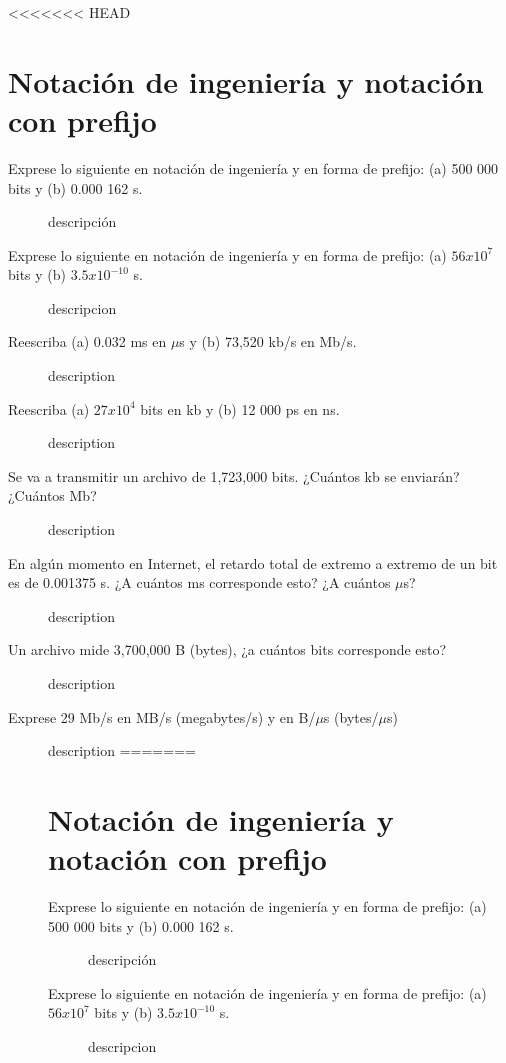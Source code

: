 <<<<<<< HEAD

\section*{Notaci\'on de ingenier\'ia y notaci\'on con prefijo}

\begin{description}
	\item[Exprese lo siguiente en notación de ingeniería y en forma de prefijo: (a) 500 000 bits y (b) 0.000 162 s.] 
	descripción
	
	\item[Exprese lo siguiente en notación de ingeniería y en forma de prefijo: (a) $56x10^7$ bits y (b) $3.5x10^{-10}$ s.]
	descripcion
	
	\item[Reescriba (a) 0.032 ms en $\mu$s y (b) 73,520 kb/s en Mb/s.]
	description
	
	\item[Reescriba (a) $27x10^4$ bits en kb y (b) 12 000 ps en ns.]
	description
	
	\item[Se va a transmitir un archivo de 1,723,000 bits. ¿Cuántos kb se enviarán? ¿Cuántos Mb?] description
	
	\item[En algún momento en Internet, el retardo total de extremo a extremo de un bit es de 0.001375 s. ¿A cuántos ms corresponde esto? ¿A cuántos $\mu$s?]
	description
	
	\item[Un archivo mide 3,700,000 B (bytes), ¿a cuántos bits corresponde esto?]
	description
	
	\item[Exprese 29 Mb/s en MB/s (megabytes/s) y en B/$\mu$s (bytes/$\mu$s)] description
=======

\section*{Notaci\'on de ingenier\'ia y notaci\'on con prefijo}

\begin{description}
	\item[Exprese lo siguiente en notación de ingeniería y en forma de prefijo: (a) 500 000 bits y (b) 0.000 162 s.] 
	descripción
	
	\item[Exprese lo siguiente en notación de ingeniería y en forma de prefijo: (a) $56x10^7$ bits y (b) $3.5x10^{-10}$ s.]
	descripcion
	

\end{description}
\end{description}
